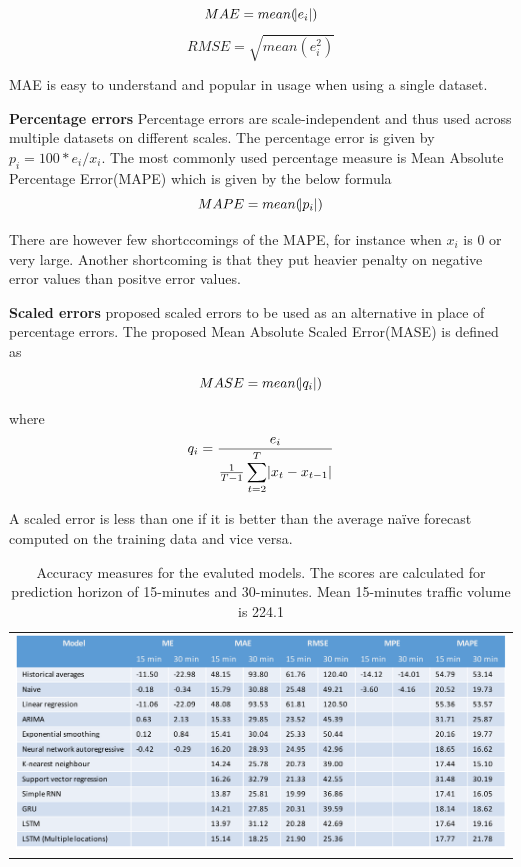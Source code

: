     \begin{equation}
        MAE = mean(\abs{e_{i}})
    \end{equation}
    \begin{equation}
        RMSE = \sqrt{mean(e^{2}_{i})}
    \end{equation}

MAE is easy to understand and popular in usage when using a single dataset.

\textbf{Percentage errors}
Percentage errors are scale-independent and thus used across multiple datasets on different
scales. The percentage error is given by $p_{i} = 100*e_{i}/x_{i}$. The most commonly used
percentage measure is Mean Absolute Percentage Error(MAPE) which is given by the below formula
    \begin{equation}
        MAPE = mean(\abs{p_{i}})
    \end{equation}

There are however few shortccomings of the MAPE, for instance when $x_{i}$ is 0 or very large.
Another shortcoming is that they put heavier penalty on negative error values than positve error
values.

\textbf{Scaled errors}
\citet{hyndman2006another} proposed scaled errors to be used as an alternative in place of
percentage errors. The proposed Mean Absolute Scaled Error(MASE) is defined as

    \begin{equation}
        MASE = mean(\abs{q_{i}})
    \end{equation}

where
    \begin{equation}
        q_{i} = \frac{e_{i}}{\frac{1}{T-1} \displaystyle\sum_{t=2}^{T}\abs{x_{t} - x_{t-1}}}
    \end{equation}

A scaled error is less than one if it is better than the average naïve forecast computed on the
training data and vice versa.

\begin{table}
    \begin{tabular}{c}
        \includegraphics[width=\textwidth,height=\textheight,keepaspectratio]{Figures/errors-table.pdf}
    \end{tabular}
    \caption[Model comparisons]{Accuracy measures for the evaluted models. The scores are
    calculated for prediction horizon of 15-minutes and 30-minutes. Mean 15-minutes traffic
    volume is 224.1}
    \label{table:accuracyScores}
\end{table}
